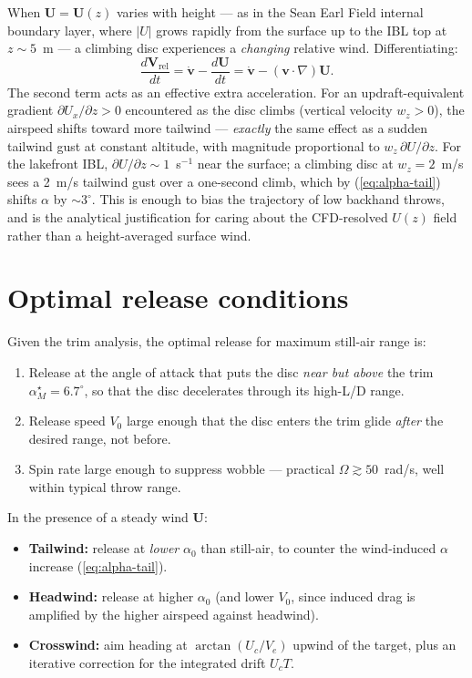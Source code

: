 \documentclass[11pt,letterpaper]{article}
\begin{document}
When $\mathbf{U} = \mathbf{U}(z)$ varies with height --- as in the Sean Earl Field internal boundary layer, where $|U|$ grows rapidly from the surface up to the IBL top at $z \sim 5$~m --- a climbing disc experiences a \emph{changing} relative wind. Differentiating:
\begin{equation}
\frac{d\mathbf{V}_{\text{rel}}}{dt} = \dot{\mathbf{v}} - \frac{d\mathbf{U}}{dt} = \dot{\mathbf{v}} - (\mathbf{v}\cdot\nabla)\mathbf{U}.
\end{equation}
The second term acts as an effective extra acceleration. For an updraft-equivalent gradient $\partial U_x/\partial z > 0$ encountered as the disc climbs (vertical velocity $w_z > 0$), the airspeed shifts toward more tailwind --- \emph{exactly} the same effect as a sudden tailwind gust at constant altitude, with magnitude proportional to $w_z\,\partial U/\partial z$. For the lakefront IBL, $\partial U/\partial z \sim 1$~s$^{-1}$ near the surface; a climbing disc at $w_z = 2$~m/s sees a 2~m/s tailwind gust over a one-second climb, which by (\ref{eq:alpha-tail}) shifts $\alpha$ by $\sim 3^\circ$. This is enough to bias the trajectory of low backhand throws, and is the analytical justification for caring about the CFD-resolved $U(z)$ field rather than a height-averaged surface wind.

\section{Optimal release conditions}

Given the trim analysis, the optimal release for maximum still-air range is:
\begin{enumerate}[leftmargin=*,itemsep=2pt]
  \item Release at the angle of attack that puts the disc \emph{near but above} the trim $\alpha_M^\star = 6.7^\circ$, so that the disc decelerates through its high-L/D range.
  \item Release speed $V_0$ large enough that the disc enters the trim glide \emph{after} the desired range, not before.
  \item Spin rate large enough to suppress wobble --- practical $\Omega \gtrsim 50$~rad/s, well within typical throw range.
\end{enumerate}

In the presence of a steady wind $\mathbf{U}$:
\begin{itemize}[leftmargin=*,itemsep=2pt]
  \item \textbf{Tailwind:} release at \emph{lower} $\alpha_0$ than still-air, to counter the wind-induced $\alpha$ increase (\ref{eq:alpha-tail}).
  \item \textbf{Headwind:} release at higher $\alpha_0$ (and lower $V_0$, since induced drag is amplified by the higher airspeed against headwind).
  \item \textbf{Crosswind:} aim heading at $\arctan(U_c/V_e)$ upwind of the target, plus an iterative correction for the integrated drift $U_c T$.
\end{itemize}
\end{document}
